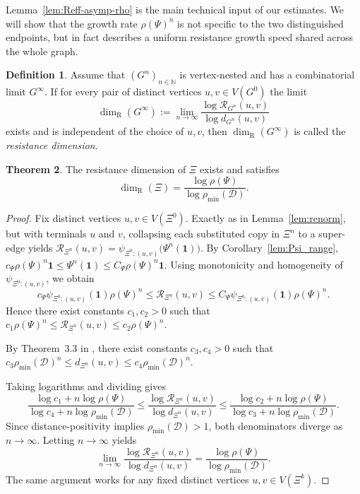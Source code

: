 \documentclass{article}
\theoremstyle{plain}
\theoremstyle{definition}
\newtheorem{theorem}{Theorem}[section]
\newtheorem{definition}[theorem]{Definition}
\newcommand{\Reff}{\mathscr{R}}
\newcommand{\dimresis}{\dim_\mathrm{R}}
\begin{document}
Lemma~\ref{lem:Reff-asymp-rho} is the main technical input of our estimates.
We will show that the growth rate $\rho(\Psi)^n$ is not specific to the two distinguished endpoints, but in fact describes a uniform resistance growth speed shared across the whole graph.

\begin{definition}\label{def:resistance_dimension}
Assume that $(G^n)_{n\in\mathbb N}$ is vertex-nested and has a combinatorial limit $G^\infty$.
If for every pair of distinct vertices $u,v\in V(G^0)$ the limit
\[
\dimresis(G^\infty):=\lim_{n\to\infty}\frac{\log \Reff_{G^n}(u,v)}{\log d_{G^n}(u,v)}
\]
exists and is independent of the choice of $u,v$,
then $\dimresis(G^\infty)$ is called the \emph{resistance dimension}.
\end{definition}

\begin{theorem}\label{thm:resistance_dimension_formula}
The resistance dimension of $\Xi$ exists and satisfies
\[
\dimresis(\Xi)=\frac{\log \rho(\Psi)}{\log \rho_{\min}(\mathcal D)}.
\]
\end{theorem}

\begin{proof}
Fix distinct vertices $u,v\in V(\Xi^0)$.
Exactly as in Lemma~\ref{lem:renorm}, but with terminals $u$ and $v$, collapsing each substituted copy in $\Xi^n$ to a super-edge yields
$
\Reff_{\Xi^n}(u,v)
=
\psi_{\Xi^0:(u,v)}\bigl(\Psi^n(\mathbf 1)\bigr).
$
By Corollary~\ref{lem:Psi_range},
$
c_{\Psi}\rho(\Psi)^n\mathbf 1
\le
\Psi^n(\mathbf 1)
\le
C_{\Psi}\rho(\Psi)^n\mathbf 1.
$
Using monotonicity and homogeneity of $\psi_{\Xi^0:(u,v)}$, we obtain
\[
c_{\Psi}\psi_{\Xi^0:(u,v)}(\mathbf 1)\rho(\Psi)^n
\le
\Reff_{\Xi^n}(u,v)
\le
C_{\Psi}\psi_{\Xi^0:(u,v)}(\mathbf 1)\rho(\Psi)^n.
\]
Hence there exist constants $c_1,c_2>0$ such that
$
c_1\rho(\Psi)^n
\le
\Reff_{\Xi^n}(u,v)
\le
c_2\rho(\Psi)^n.
$

By Theorem~3.3 in \cite{neroli2024fractal}, there exist constants $c_3,c_4>0$ such that
$
c_3\rho_{\min}(\mathcal D)^n
\le
d_{\Xi^n}(u,v)
\le
c_4\rho_{\min}(\mathcal D)^n.
$

Taking logarithms and dividing gives
\[
\frac{\log c_1+n\log\rho(\Psi)}{\log c_4+n\log\rho_{\min}(\mathcal D)}
\le
\frac{\log \Reff_{\Xi^n}(u,v)}{\log d_{\Xi^n}(u,v)}
\le
\frac{\log c_2+n\log\rho(\Psi)}{\log c_3+n\log\rho_{\min}(\mathcal D)}.
\]
Since distance-positivity implies $\rho_{\min}(\mathcal D)>1$, both denominators diverge as $n\to\infty$.
Letting $n\to\infty$ yields
\[
\lim_{n\to\infty}\frac{\log \Reff_{\Xi^n}(u,v)}{\log d_{\Xi^n}(u,v)}
=
\frac{\log \rho(\Psi)}{\log \rho_{\min}(\mathcal D)}.
\]
The same argument works for any fixed distinct vertices $u,v\in V(\Xi^k)$.
\end{proof}
\end{document}
